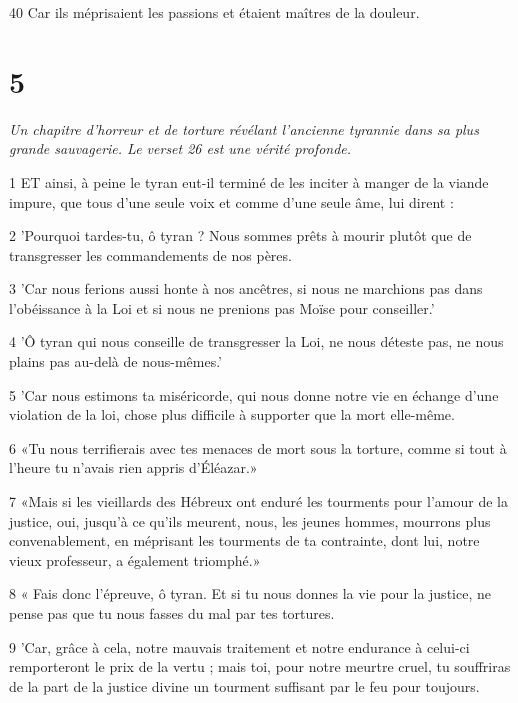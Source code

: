 \par 40 Car ils méprisaient les passions et étaient maîtres de la douleur.

\chapter{5}

\par \textit{Un chapitre d'horreur et de torture révélant l'ancienne tyrannie dans sa plus grande sauvagerie. Le verset 26 est une vérité profonde.}

\par 1 ET ainsi, à peine le tyran eut-il terminé de les inciter à manger de la viande impure, que tous d'une seule voix et comme d'une seule âme, lui dirent :

\par 2 'Pourquoi tardes-tu, ô tyran ? Nous sommes prêts à mourir plutôt que de transgresser les commandements de nos pères.

\par 3 'Car nous ferions aussi honte à nos ancêtres, si nous ne marchions pas dans l'obéissance à la Loi et si nous ne prenions pas Moïse pour conseiller.'

\par 4 'Ô tyran qui nous conseille de transgresser la Loi, ne nous déteste pas, ne nous plains pas au-delà de nous-mêmes.'

\par 5 'Car nous estimons ta miséricorde, qui nous donne notre vie en échange d'une violation de la loi, chose plus difficile à supporter que la mort elle-même.

\par 6 «Tu nous terrifierais avec tes menaces de mort sous la torture, comme si tout à l'heure tu n'avais rien appris d'Éléazar.»

\par 7 «Mais si les vieillards des Hébreux ont enduré les tourments pour l'amour de la justice, oui, jusqu'à ce qu'ils meurent, nous, les jeunes hommes, mourrons plus convenablement, en méprisant les tourments de ta contrainte, dont lui, notre vieux professeur, a également triomphé.»

\par 8 « Fais donc l'épreuve, ô tyran. Et si tu nous donnes la vie pour la justice, ne pense pas que tu nous fasses du mal par tes tortures.

\par 9 'Car, grâce à cela, notre mauvais traitement et notre endurance à celui-ci remporteront le prix de la vertu ; mais toi, pour notre meurtre cruel, tu souffriras de la part de la justice divine un tourment suffisant par le feu pour toujours.

